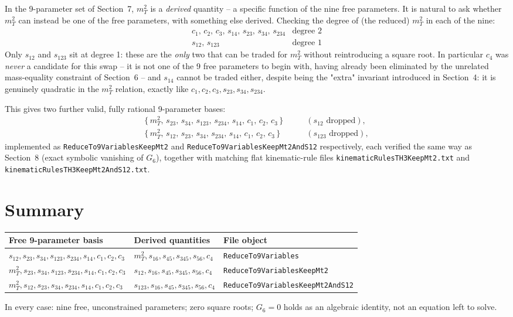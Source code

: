 \documentclass[11pt]{article}
\newcommand{\code}[1]{\texttt{#1}}
\begin{document}
In the 9-parameter set of Section~7, $m_T^2$ is a \emph{derived} quantity -- a specific function of the nine free parameters. It is natural to ask whether $m_T^2$ can instead be one of the free parameters, with something else derived. Checking the degree of (the reduced) $m_T^2$ in each of the nine:
\[
  \begin{array}{ll}
    c_1,\,c_2,\,c_3,\,s_{14},\,s_{23},\,s_{34},\,s_{234} & \text{degree } 2 \\[2pt]
    s_{12},\,s_{123} & \text{degree } 1
  \end{array}
\]
Only $s_{12}$ and $s_{123}$ sit at degree 1: these are the \emph{only} two that can be traded for $m_T^2$ without reintroducing a square root. In particular $c_4$ was \emph{never} a candidate for this swap -- it is not one of the 9 free parameters to begin with, having already been eliminated by the unrelated mass-equality constraint of Section~6 -- and $s_{14}$ cannot be traded either, despite being the "extra" invariant introduced in Section~4: it is genuinely quadratic in the $m_T^2$ relation, exactly like $c_1,c_2,c_3,s_{23},s_{34},s_{234}$.

This gives two further valid, fully rational 9-parameter bases:
\begin{align*}
  \{\,m_T^2,\,s_{23},\,s_{34},\,s_{123},\,s_{234},\,s_{14},\,c_1,\,c_2,\,c_3\,\} &\qquad (s_{12}\text{ dropped}),\\
  \{\,m_T^2,\,s_{12},\,s_{23},\,s_{34},\,s_{234},\,s_{14},\,c_1,\,c_2,\,c_3\,\} &\qquad (s_{123}\text{ dropped}),
\end{align*}
implemented as \code{ReduceTo9VariablesKeepMt2} and \code{ReduceTo9VariablesKeepMt2AndS12} respectively, each verified the same way as Section~8 (exact symbolic vanishing of $G_6$), together with matching flat kinematic-rule files \code{kinematicRulesTH3KeepMt2.txt} and \code{kinematicRulesTH3KeepMt2AndS12.txt}.

\section{Summary}

\begin{table}[h]
\centering
\begin{tabular}{@{}lll@{}}
\toprule
Free 9-parameter basis & Derived quantities & File object \\
\midrule
$s_{12},s_{23},s_{34},s_{123},s_{234},s_{14},c_1,c_2,c_3$ & $m_T^2,s_{16},s_{45},s_{345},s_{56},c_4$ & \code{ReduceTo9Variables} \\
$m_T^2,s_{23},s_{34},s_{123},s_{234},s_{14},c_1,c_2,c_3$ & $s_{12},s_{16},s_{45},s_{345},s_{56},c_4$ & \code{ReduceTo9VariablesKeepMt2} \\
$m_T^2,s_{12},s_{23},s_{34},s_{234},s_{14},c_1,c_2,c_3$ & $s_{123},s_{16},s_{45},s_{345},s_{56},c_4$ & \code{ReduceTo9VariablesKeepMt2AndS12} \\
\bottomrule
\end{tabular}
\end{table}

\noindent In every case: nine free, unconstrained parameters; zero square roots; $G_6=0$ holds as an algebraic identity, not an equation left to solve.
\end{document}
